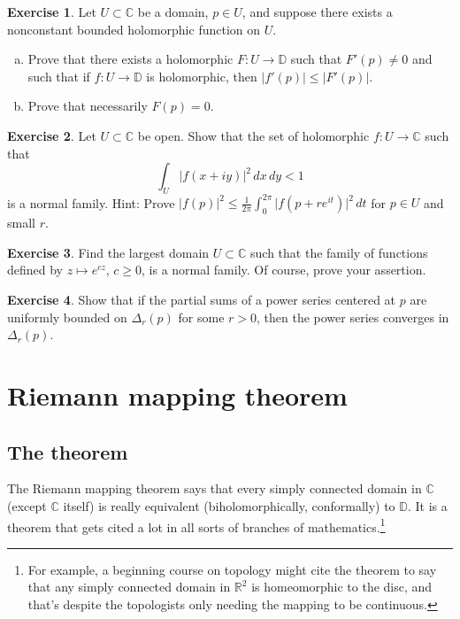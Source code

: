\documentclass[12pt,openany]{book}
\newcommand{\sabs}[1]{\lvert {#1} \rvert}
\newcommand{\abs}[1]{\left\lvert {#1} \right\rvert}
\newcommand{\C}{{\mathbb{C}}}
\newcommand{\R}{{\mathbb{R}}}
\newcommand{\D}{{\mathbb{D}}}
\theoremstyle{plain}
\theoremstyle{remark}
\theoremstyle{definition}
\newenvironment{exbox}{%
    \def\FrameCommand{\vrule width 1pt \relax\hspace{10pt}}%
    \MakeFramed{\advance\hsize-\width\FrameRestore}%
}{%
    \endMakeFramed
}
\newenvironment{exparts}{%
    \leavevmode\begin{enumerate}[a),noitemsep,topsep=0pt,parsep=0pt,partopsep=0pt]
}{%
    \end{enumerate}
}
\theoremstyle{exercise}
\newtheorem{exercise}{Exercise}[section]
\theoremstyle{example}
\begin{document}
\begin{exbox}
\begin{exercise}
Let $U \subset \C$ be a domain, $p \in U$,
and suppose there exists a nonconstant
bounded holomorphic function on $U$.
\begin{exparts}
\item
Prove that there exists a holomorphic $F \colon U \to \D$
such that
$F'(p) \neq 0$ and such that if
$f \colon U \to \D$ is holomorphic,
then $\sabs{f'(p)} \leq \sabs{F'(p)}$.
\item
Prove that necessarily $F(p) = 0$.
\end{exparts}
\end{exercise}

\begin{exercise}
Let $U \subset \C$ be open.
Show that the set of holomorphic
$f \colon U \to \C$ such that
\begin{equation*}
\int_{U} \abs{f(x+iy)}^2 \, dx \, dy < 1
\end{equation*}
is a normal family.
Hint:
Prove
$\sabs{f(p)}^2 \leq
\frac{1}{2\pi} \int_{0}^{2\pi} \sabs{f(p+re^{it})}^2 \, dt$
for $p \in U$ and small $r$.
\end{exercise}

\begin{exercise}
Find the largest domain $U \subset \C$ such that the family
of functions defined by $z \mapsto e^{cz}$, $c \geq 0$, is a
normal family.  Of course, prove your assertion.
\end{exercise}

\begin{exercise}
Show that if the partial sums of a power series centered at $p$
are uniformly bounded on $\Delta_r(p)$ for some $r > 0$,
then the power series converges in $\Delta_r(p)$.
\end{exercise}
\end{exbox}


\section{Riemann mapping theorem}
\label{sec:RMT}

\subsection{The theorem}\label{subsec:RMT}

The Riemann mapping theorem says that
every simply connected domain in $\C$ (except $\C$ itself) is really
equivalent (biholomorphically, conformally) to $\D$.
It is a theorem that gets cited a lot in all sorts of branches of
mathematics.\footnote{For example, a beginning course on topology might cite
the theorem to say that any simply connected domain in $\R^2$
is homeomorphic to the disc, and that's despite the topologists only
needing the mapping to be continuous.}
\end{document}
